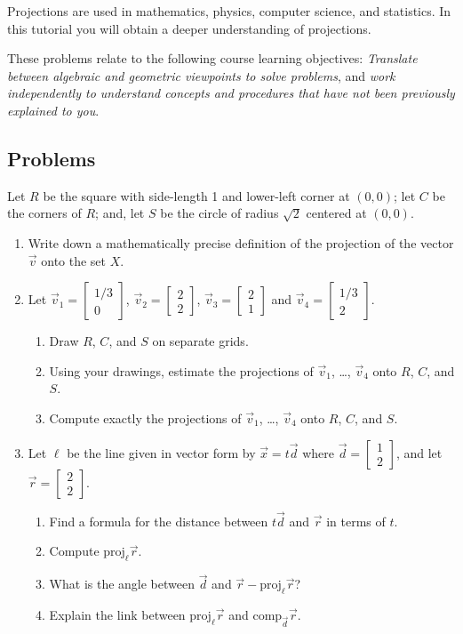 \documentclass[red]{tutorial}
\newcommand{\Proj}{\mathrm{proj}}
\newcommand{\Comp}{\mathrm{comp}}
\newcommand{\mat}[1]{\begin{bmatrix}#1\end{bmatrix}}
\theoremstyle{definition}
\theoremstyle{theorem}
\begin{document}
	\begin{tutorial}

		\begin{objectives}
			Projections are used in mathematics, physics, computer science, and
			statistics.
	In this tutorial you will obtain a deeper understanding of projections.

	These problems relate to the following course learning objectives:
			\textit{Translate between algebraic and geometric viewpoints to solve problems},
			and
			\textit{work independently to understand concepts and procedures that have not been previously
			explained to you}.
		\end{objectives}

		\vspace{-.5em}
		\subsection*{Problems}
		\vspace{-.5em}

		Let $R$ be the square with side-length 1 and lower-left corner at $(0,0)$;
		let $C$ be the corners of $R$; and, let $S$ be the circle of radius $\sqrt{2}$ centered
		at $(0,0)$.

\begin{enumerate}
	\item Write down a mathematically precise definition of the projection of the vector $\vec v$ onto the set $X$.
	\item Let $\vec v_1=\mat{1/3\\0}$, $\vec v_2=\mat{2\\2}$, $\vec v_3=\mat{2\\1}$ and $\vec v_4=\mat{1/3\\2}$.
	\begin{enumerate}
		\item Draw $R$, $C$, and $S$ on separate grids.
		\item Using your drawings, estimate the projections of $\vec v_1$, \ldots, $\vec v_4$ onto $R$, $C$, and $S$.
		\item Compute exactly the projections of $\vec v_1$, \ldots, $\vec v_4$ onto $R$, $C$, and $S$.
	\end{enumerate}


	\item Let $\ell$ be the line given in vector form by $\vec x=t\vec d$ where $\vec d=\mat{1\\2}$, and let $\vec r=\mat{2\\2}$.
		\begin{enumerate}
			\item Find a formula for the distance between $t\vec d$ and $\vec r$ in terms of $t$.
			\item Compute $\Proj_\ell \vec r$.
			\item What is the angle between $\vec d$ and $\vec r-\Proj_\ell \vec r$?
			\item Explain the link between $\Proj_\ell \vec r$ and $\Comp_{\vec d}\vec r$.
		\end{enumerate}


\end{enumerate}
\end{tutorial}
\end{document}
